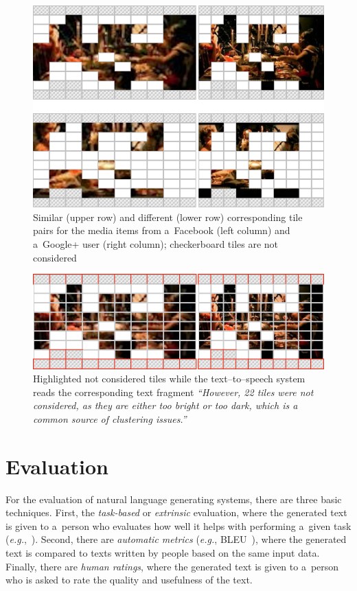 \documentclass{article}
\begin{document}
\begin{figure}[t!]
  \centering
  \includegraphics[width=0.75\linewidth]{./similar-different.png}
  \caption{Similar (upper row) and different (lower row) corresponding tile pairs for the media items from a~Facebook (left column) and a~Google+ user (right column); checkerboard tiles are not considered}
  \label{fig:similar-different}
\end{figure}

\begin{figure}[t!]
  \centering
  \includegraphics[width=0.75\linewidth]{./tile-highlight.png}
  \caption{Highlighted not considered tiles
    while the text--to--speech system reads the corresponding text fragment
    \textit{``However, 22 tiles were not considered,
    as they are either too bright or too dark,
    which is a common source of clustering issues.''}}
  \label{fig:tile-highlight}
\end{figure}

\section{Evaluation}
\label{sec:evaluation}

For the evaluation of natural language generating systems,
there are three basic techniques.
First, the \emph{task-based} or \emph{extrinsic} evaluation,
where the generated text is given to a~person
who evaluates how well it helps with performing a~given task
(\emph{e.g.},~\cite{portet2009nlg}).
Second, there are \emph{automatic metrics}
(\emph{e.g.}, BLEU~\cite{papineni2002bleu}),
where the generated text is compared to texts written by people
based on the same input data.
Finally, there are \emph{human ratings}, where the generated text
is given to a~person who is asked to rate
the quality and usefulness of the text.
\end{document}
